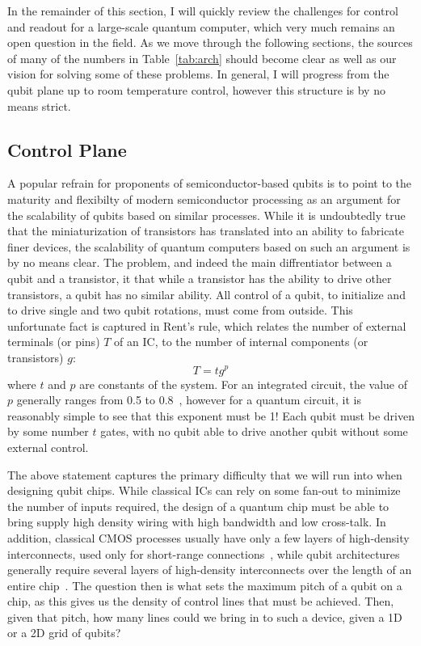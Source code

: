 In the remainder of this section, I will quickly review the challenges for control and readout for a large-scale quantum computer, which very much remains
an open question in the field. As we move through the following sections, the sources of many of the numbers in Table~\ref{tab:arch} should become clear
as well as our vision for solving some of these problems. In general, I will progress from the qubit plane up to room temperature control, however this
structure is by no means strict.

\subsection{Control Plane}
\label{sec:control}
A popular refrain for proponents of semiconductor-based qubits is to point to the maturity and flexibilty of modern semiconductor processing as an argument
for the scalability of qubits based on similar processes. While it is undoubtedly true that the miniaturization of transistors has translated into an ability
to fabricate finer devices, the scalability of quantum computers based on such an argument is by no means clear. The problem, and indeed the main diffrentiator
between a qubit and a transistor, it that while a transistor has the ability to drive other transistors, a qubit has no similar ability. All control of a qubit,
to initialize and to drive single and two qubit rotations, must come from outside. This unfortunate fact is captured in Rent's rule, which relates the number of
external terminals (or pins) $T$ of an IC, to the number of internal components (or transistors) $g$:
\begin{equation}
  T = tg^p
  \label{eq:rent}
\end{equation}
where $t$ and $p$ are constants of the system. For an integrated circuit, the value of $p$ generally ranges from 0.5 to 0.8~\cite{5388820}, however for a quantum
circuit, it is reasonably simple to see that this exponent must be 1! Each qubit must be driven by some number $t$ gates, with no qubit able to drive another
qubit without some external control.

The above statement captures the primary difficulty that we will run into when designing qubit chips. While classical ICs can rely on some fan-out to minimize
the number of inputs required, the design of a quantum chip must be able to bring supply high density wiring with high bandwidth and low cross-talk. In addition,
classical CMOS processes usually have only a few layers of high-density interconnects, used only for short-range connections~\cite{5424258}, while qubit
architectures generally require several layers of high-density interconnects over the length of an entire chip~\cite{s41467-017-01905-6}. The question then is
what sets the maximum pitch of a qubit on a chip, as this gives us the density of control lines that must be achieved. Then, given that pitch, how many lines could
we bring in to such a device, given a 1D or a 2D grid of qubits?

